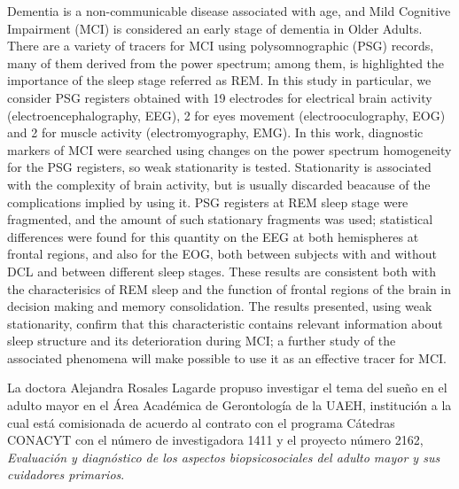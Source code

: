 \documentclass[12pt,letterpaper]{book}
\begin{document}
\begin{small}
Dementia is a non-communicable disease associated with age, and Mild Cognitive Impairment (MCI) is considered an early stage of dementia in Older Adults.
%
There are a variety of tracers for MCI using polysomnographic (PSG) records, many of them derived from the power spectrum; among them, is highlighted the importance of the sleep stage referred as REM.
%
In this study in particular, we consider PSG registers obtained with 19 electrodes for electrical brain activity (electroencephalography, EEG), 2 for eyes movement (electrooculography, EOG) and 2 for muscle activity (electromyography, EMG).
%
In this work, diagnostic markers of MCI were searched using changes on the power spectrum homogeneity for the PSG registers, so weak stationarity is tested.
%
Stationarity is associated with the complexity of brain activity, but is usually discarded beacause of the complications implied by using it.
%
PSG registers at REM sleep stage were fragmented, and the amount of such stationary fragments was used;
statistical differences were found for this quantity on the EEG at both hemispheres at frontal regions, and also for the EOG, both between subjects with and without DCL and between different sleep stages.
%
These results are consistent both with the characterisics of REM sleep and the function of frontal regions of the brain in decision making and memory consolidation.
%
The results presented, using weak stationarity, confirm that this characteristic contains relevant information about sleep structure and its deterioration during MCI; a further study of the associated phenomena will make possible to use it as an effective tracer for MCI.
\end{small}



\newpage

La doctora Alejandra Rosales Lagarde propuso investigar el tema del sueño en el adulto mayor en el
Área Académica de Gerontología de la UAEH, institución a la cual está comisionada de acuerdo al 
contrato con el programa Cátedras CONACYT con el número de investigadora 1411 y el proyecto número 
2162, \textit{Evaluación y diagnóstico de los aspectos biopsicosociales del adulto mayor y sus 
cuidadores primarios}. 
\end{document}
